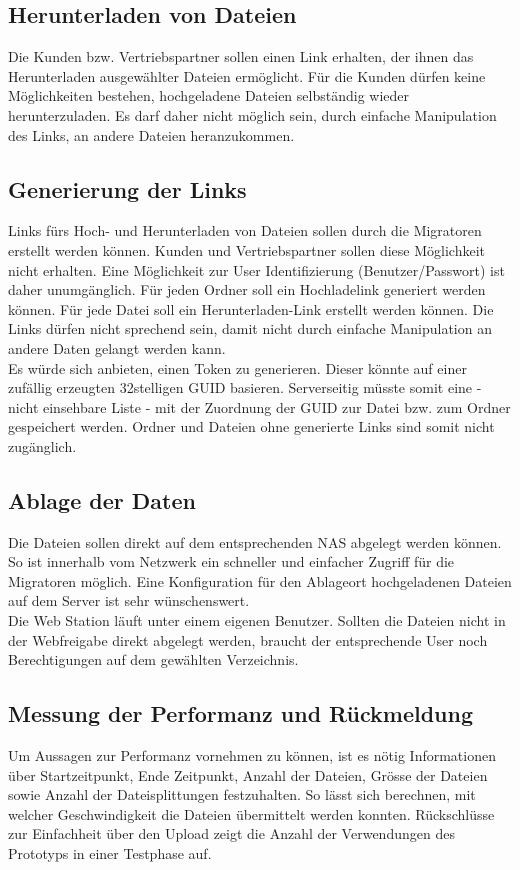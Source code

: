 \subsection{Herunterladen von Dateien}
Die Kunden bzw. Vertriebspartner sollen einen Link erhalten, der ihnen das Herunterladen ausgewählter Dateien ermöglicht.
Für die Kunden dürfen keine Möglichkeiten bestehen, hochgeladene Dateien selbständig wieder herunterzuladen. 
Es darf daher nicht möglich sein, durch einfache Manipulation des Links, an andere Dateien heranzukommen.

\subsection{Generierung der Links}\label{subsec:Links}
Links fürs Hoch- und Herunterladen von Dateien sollen durch die Migratoren erstellt werden können. Kunden und Vertriebspartner sollen diese Möglichkeit nicht erhalten. 
Eine Möglichkeit zur User Identifizierung (Benutzer/Passwort) ist daher unumgänglich.
Für jeden Ordner soll ein Hochladelink generiert werden können. Für jede Datei soll ein Herunterladen-Link erstellt werden können. 
Die Links dürfen nicht sprechend sein, damit nicht durch einfache Manipulation an andere Daten gelangt werden kann. 
\\ 
Es würde sich anbieten, einen Token zu generieren. Dieser könnte auf einer zufällig erzeugten 32stelligen GUID basieren.
Serverseitig müsste somit eine - nicht einsehbare Liste - mit der Zuordnung der GUID zur Datei bzw. zum Ordner gespeichert werden.
Ordner und Dateien ohne generierte Links sind somit nicht zugänglich.

\subsection{Ablage der Daten}
Die Dateien sollen direkt auf dem entsprechenden NAS abgelegt werden können. So ist innerhalb vom Netzwerk ein schneller und einfacher Zugriff für die Migratoren möglich.
Eine Konfiguration für den Ablageort hochgeladenen Dateien auf dem Server ist sehr wünschenswert.
\\
Die Web Station läuft unter einem eigenen Benutzer. 
Sollten die Dateien nicht in der Webfreigabe direkt abgelegt werden, braucht der entsprechende User noch Berechtigungen auf dem gewählten Verzeichnis.

\subsection{Messung der Performanz und Rückmeldung}
Um Aussagen zur Performanz vornehmen zu können, ist es nötig Informationen über Startzeitpunkt, Ende Zeitpunkt, Anzahl der Dateien, Grösse der Dateien sowie Anzahl der Dateisplittungen festzuhalten.
So lässt sich berechnen, mit welcher Geschwindigkeit die Dateien übermittelt werden konnten.
Rückschlüsse zur Einfachheit über den Upload zeigt die Anzahl der Verwendungen des Prototyps in einer Testphase auf.
